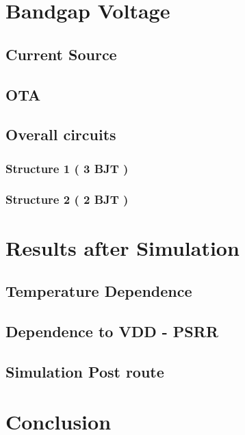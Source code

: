 \documentclass[11pt,a4paper]{report}
\begin{document}
\chapter{Bandgap Voltage}
\section{Current Source}
\section{OTA}
\section{Overall circuits}
\subsection{ Structure 1 ( 3 BJT )}
\subsection{ Structure 2 ( 2 BJT )}
\chapter{Results after Simulation}
\section{Temperature Dependence}
\section{Dependence to VDD - PSRR}
\section{Simulation Post route}

\chapter*{Conclusion}



\begin{appendices}

\end{appendices}

\end{document}
